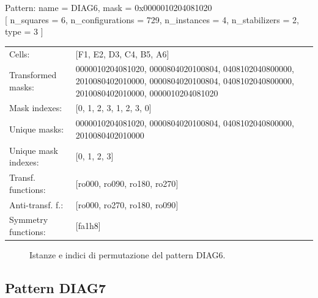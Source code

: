 \begin{tcolorbox}[sharp corners, fontupper=\ttfamily\small, colback=white]
  \noindent Pattern: name = DIAG6, mask = 0x0000010204081020\\
  {[} n\_squares = 6, n\_configurations = 729,
  n\_instances = 4, n\_stabilizers = 2, type = 3 { ]}\\[1.0ex]
  \begin{tabularx}{\textwidth}{@{} p{3.5cm} X @{}}
    Cells:               & {[}F1, E2, D3, C4, B5, A6{]}\\[0.5ex]
    Transformed masks:   & 0000010204081020, 0000804020100804, 0408102040800000, 2010080402010000, 0000804020100804, 0408102040800000, 2010080402010000, 0000010204081020\\[0.5ex]
    Mask indexes:        & {[}0, 1, 2, 3, 1, 2, 3, 0{]}\\[0.5ex]
    Unique masks:        & 0000010204081020, 0000804020100804, 0408102040800000, 2010080402010000\\[0.5ex]
    Unique mask indexes: & {[}0, 1, 2, 3{]}\\[0.5ex]
    Transf. functions:   & {[}ro000, ro090, ro180, ro270{]}\\[0.5ex]
    Anti-transf. f.:     & {[}ro000, ro270, ro180, ro090{]}\\[0.5ex]
    Symmetry functions:  & {[}fa1h8{]}\\[0.5ex]
  \end{tabularx}
\end{tcolorbox}

\begin{figure}[htbp]
  \centering
   \hfill
   \hfill
   \hfill
  \vspace{0.3cm}
   \hfill
   \hfill
   \hfill
  \caption{Istanze e indici di permutazione del pattern DIAG6.}
\end{figure}

\newpage

\subsection{Pattern DIAG7}

